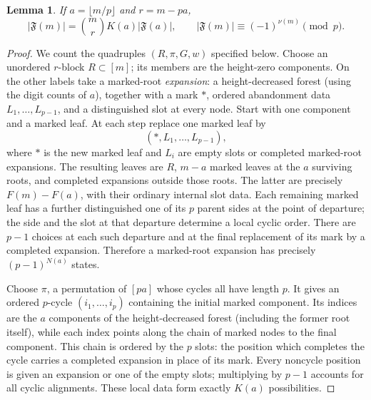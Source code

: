 \documentclass[10pt]{article}
\newtheorem{lemma}{Lemma}
\theoremstyle{definition}\newtheorem*{definition}{Definition}
\theoremstyle{remark}\newtheorem*{remark}{Remark}
\newcommand{\F}{\mathfrak F}
\begin{document}
\begin{lemma}\label{recursion} If $a=\lfloor m/p\rfloor$ and $r=m-pa$,
\begin{equation}\label{forest}
 |\F(m)|=\binom mrK(a)|\F(a)|,\qquad
 |\F(m)|\equiv(-1)^{\nu(m)}\pmod p.
\end{equation}\end{lemma}
\begin{proof} We count the quadruples $(R,\pi,G,w)$ specified below.
Choose an unordered $r$-block $R\subset[m]$; its members are the height-zero
components. On the other labels take a marked-root \emph{expansion}: a
height-decreased forest (using the digit counts of $a$), together with a
mark $*$, ordered abandonment data $L_1,\ldots,L_{p-1}$, and a distinguished
slot at every node. Start with one component and a marked leaf. At each step
replace one marked leaf by
\[
 (*,L_1,\ldots,L_{p-1}),
\]
where $*$ is the new marked leaf and $L_i$ are empty slots or completed
marked-root expansions. The resulting leaves are $R$, $m-a$ marked leaves at
the $a$ surviving roots, and completed expansions outside those roots. The
latter are precisely $F(m)-F(a)$, with their ordinary internal slot data.
Each remaining marked leaf has a further distinguished one of its $p$ parent
sides at the point of departure; the side and the slot at that departure
determine a local cyclic order. There are $p-1$ choices at each such
departure and at the final replacement of its mark by a completed expansion.
Therefore a marked-root expansion has precisely $(p-1)^{N(a)}$ states.

Choose $\pi$, a permutation of $[pa]$ whose cycles all have length $p$. It
gives an ordered $p$-cycle $(i_1,\ldots,i_p)$ containing the initial marked
component. Its indices are the $a$ components of the height-decreased forest
(including the former root itself), while each index points along the chain
of marked nodes to the final component. This chain is ordered by the $p$
slots: the position which completes the cycle carries a completed expansion
in place of its mark. Every noncycle position is given an expansion or one of
the empty slots; multiplying by $p-1$ accounts for all cyclic alignments.
These local data form exactly $K(a)$ possibilities.


\end{proof}
\end{document}
